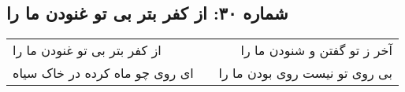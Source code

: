 \begin{center}
\section*{شماره ۳۰: از کفر بتر بی تو غنودن ما را}
\label{sec:030}
\begin{longtable}{l p{0.5cm} r}
از کفر بتر بی تو غنودن ما را
&&
آخر ز تو گفتن و شنودن ما را
\\
ای روی چو ماه کرده در خاک سیاه
&&
بی روی تو نیست روی بودن ما را
\\
\end{longtable}
\end{center}
